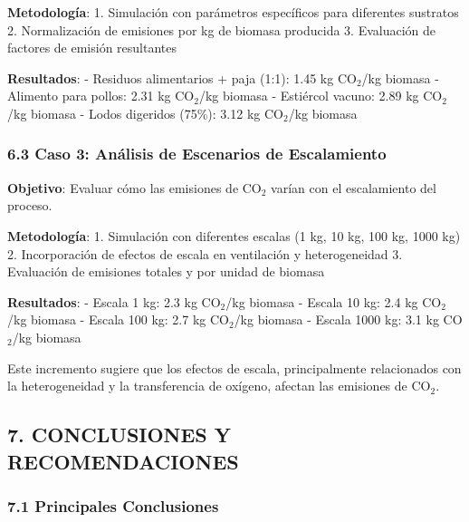 \documentclass[
]{article}
\begin{document}
\textbf{Metodología}: 1. Simulación con parámetros específicos para
diferentes sustratos 2. Normalización de emisiones por kg de biomasa
producida 3. Evaluación de factores de emisión resultantes

\textbf{Resultados}: - Residuos alimentarios + paja (1:1): 1.45 kg
CO$_2$/kg biomasa - Alimento para pollos: 2.31 kg CO$_2$/kg biomasa -
Estiércol vacuno: 2.89 kg CO$_2$/kg biomasa - Lodos digeridos (75\%): 3.12
kg CO$_2$/kg biomasa

\subsubsection{6.3 Caso 3: Análisis de Escenarios de
Escalamiento}\label{caso-3-anuxe1lisis-de-escenarios-de-escalamiento}

\textbf{Objetivo}: Evaluar cómo las emisiones de CO$_2$ varían con el
escalamiento del proceso.

\textbf{Metodología}: 1. Simulación con diferentes escalas (1 kg, 10 kg,
100 kg, 1000 kg) 2. Incorporación de efectos de escala en ventilación y
heterogeneidad 3. Evaluación de emisiones totales y por unidad de
biomasa

\textbf{Resultados}: - Escala 1 kg: 2.3 kg CO$_2$/kg biomasa - Escala 10
kg: 2.4 kg CO$_2$/kg biomasa - Escala 100 kg: 2.7 kg CO$_2$/kg biomasa -
Escala 1000 kg: 3.1 kg CO$_2$/kg biomasa

Este incremento sugiere que los efectos de escala, principalmente
relacionados con la heterogeneidad y la transferencia de oxígeno,
afectan las emisiones de CO$_2$.

\subsection{7. CONCLUSIONES Y
RECOMENDACIONES}\label{conclusiones-y-recomendaciones}

\subsubsection{7.1 Principales
Conclusiones}\label{principales-conclusiones}
\end{document}

